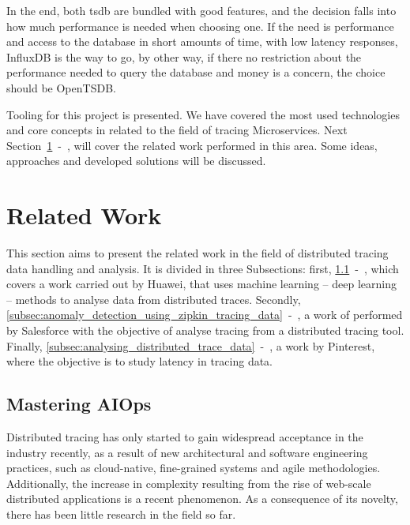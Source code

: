 In the end, both \gls{tsdb} are bundled with good features, and the decision falls into how much performance is needed when choosing one. If the need is performance and access to the database in short amounts of time, with low latency responses, InfluxDB is the way to go, by other way, if there no restriction about the performance needed to query the database and money is a concern, the choice should be OpenTSDB.

Tooling for this project is presented. We have covered the most used technologies and core concepts in related to the field of tracing Microservices. Next Section~\ref{sec:related_work}~-~, will cover the related work performed in this area. Some ideas, approaches and developed solutions will be discussed.

\section{Related Work}
\label{sec:related_work}

This section aims to present the related work in the field of distributed tracing data handling and analysis. It is divided in three Subsections: first, \ref{subsec:mastering_aiops}~-~, which covers a work carried out by Huawei, that uses machine learning -- deep learning -- methods to analyse data from distributed traces. Secondly, \ref{subsec:anomaly_detection_using_zipkin_tracing_data}~-~, a work of performed by Salesforce with the objective of analyse tracing from a distributed tracing tool. Finally, \ref{subsec:analysing_distributed_trace_data}~-~, a work by Pinterest, where the objective is to study latency in tracing data.

\subsection{Mastering AIOps}
\label{subsec:mastering_aiops}

Distributed tracing has only started to gain widespread acceptance in the industry recently, as a result of new architectural and software engineering practices, such as cloud-native, fine-grained systems and agile methodologies. Additionally, the increase in complexity resulting from the rise of web-scale distributed applications is a recent phenomenon. As a consequence of its novelty, there has been little research in the field so far.

